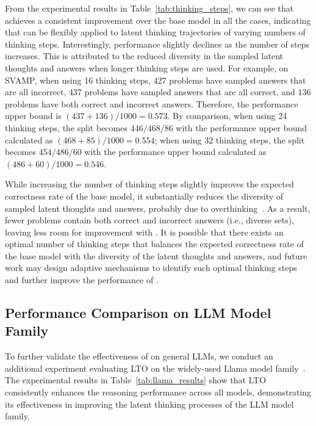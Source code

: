 \documentclass{article} %
\begin{document}
From the experimental results in Table~\ref{tab:thinking_steps}, we can see that \LTO achieves a consistent improvement over the base model in all the cases, indicating that \LTO can be flexibly applied to latent thinking trajectories of varying numbers of thinking steps.
%
Interestingly, performance slightly declines as the number of steps increases.  This is attributed to the reduced diversity in the sampled latent thoughts and answers when longer thinking steps are used. For example, on SVAMP, when using 16 thinking steps, 427 problems have sampled answers that are all incorrect, 437 problems have sampled answers that are all correct, and 136 problems have both correct and incorrect answers. Therefore, the performance upper bound is $(437+136)/1000=0.573$. By comparison, when using 24 thinking steps, the split becomes $446/468/86$ with the performance upper bound calculated as $(468+85)/1000=0.554$; when using 32 thinking steps, the split becomes $454/486/60$ with the performance upper bound calculated as $(486+60)/1000=0.546$. 
%

While increasing the number of thinking steps slightly improves the expected correctness rate of the base model, it substantially reduces the diversity of sampled latent thoughts and answers, probably due to overthinking~\citep{sui2025stop}. 
%
As a result, fewer problems contain both correct and incorrect answers (i.e., diverse sets), leaving less room for improvement with \LTO. 
%
It is possible that there exists an optimal number of thinking steps that balances the expected correctness rate of the base model with the diversity of the latent thoughts and answers, and future work may design adaptive mechanisms to identify such optimal thinking steps and further improve the performance of \LTO.
\subsection{Performance Comparison on LLM Model Family}

To further validate the effectiveness of \LTO on general LLMs, we conduct an additional experiment evaluating LTO on the widely-used Llama model family~\citep{touvron2023llama2,team2024llama}. The experimental results in Table~\ref{tab:llama_results} show that LTO consistently enhances the reasoning performance across all models, demonstrating its effectiveness in improving the latent thinking processes of the LLM model family.
\end{document}
